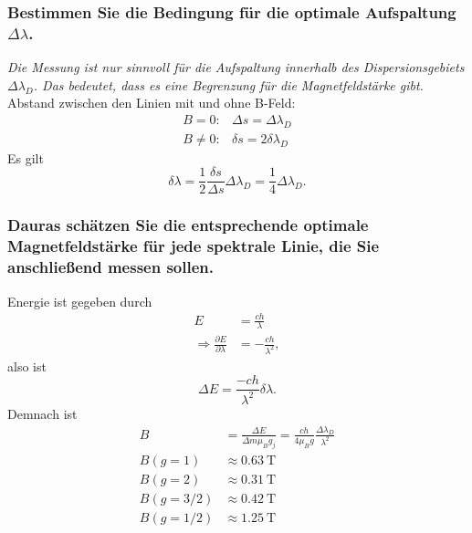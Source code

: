 \subsubsection[]{Bestimmen Sie die Bedingung für die optimale Aufspaltung $\Delta\lambda$.}
\textit{Die Messung ist nur sinnvoll für die Aufspaltung innerhalb des Dispersionsgebiets $\Delta\lambda_D$. Das bedeutet, dass 
es eine Begrenzung für die Magnetfeldstärke gibt.}\\
Abstand zwischen den Linien mit und ohne B-Feld:
\begin{align*}
    B=0:    &\Delta s=\Delta\lambda_D\\
    B\neq0: &\delta s=2\delta\lambda_D
\end{align*}
Es gilt
\begin{equation*}
    \delta\lambda=\frac{1}{2}\frac{\delta s}{\Delta s}\Delta\lambda_D=\frac{1}{4}\Delta\lambda_D .
\end{equation*}

\subsubsection{Dauras schätzen Sie die entsprechende optimale Magnetfeldstärke für jede spektrale Linie, die Sie anschließend
messen sollen.}
Energie ist gegeben durch 
\begin{align*}
    E&=\frac{ch}{\lambda}\\
    \Rightarrow \frac{\partial E}{\partial\lambda}&=-\frac{ch}{\lambda^2},
\end{align*}
also ist 
\begin{equation*}
    \Delta E= \frac{-ch}{\lambda^2}\delta\lambda .
\end{equation*}
Demnach ist 
\begin{align*}
    B&=\frac{\Delta E}{\Delta m\mu_B g_j}=\frac{ch}{4\mu_Bg}\frac{\Delta\lambda_D}{\lambda^2}\\
    B(g=1)&\approx\SI{0.63}{\tesla}\\
    B(g=2)&\approx\SI{0.31}{\tesla}\\
    B(g=3/2)&\approx\SI{0.42}{\tesla}\\
    B(g=1/2)&\approx\SI{1.25}{\tesla}
\end{align*}